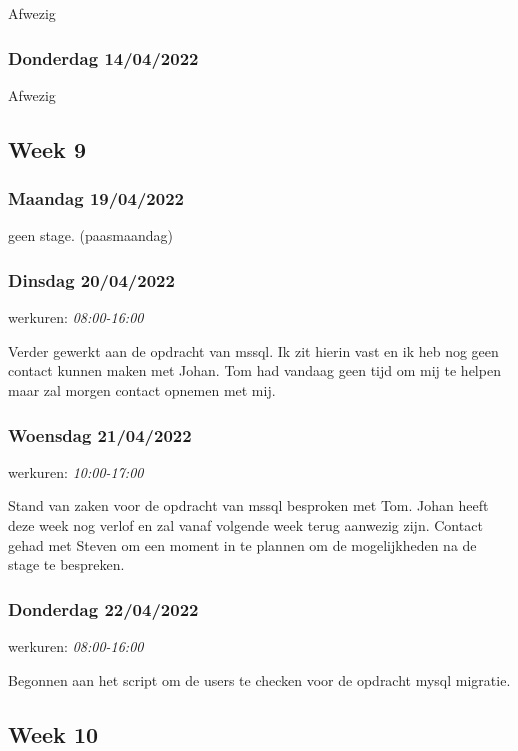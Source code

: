 Afwezig

\subsubsection{Donderdag 14/04/2022}

Afwezig

\subsection{Week 9}

\subsubsection{Maandag 19/04/2022}

geen stage. (paasmaandag)

\subsubsection{Dinsdag 20/04/2022}

werkuren: \emph{08:00-16:00}

Verder gewerkt aan de opdracht van \gls{mssql}. Ik zit hierin vast en ik heb nog geen contact kunnen maken met Johan. Tom had vandaag geen tijd om mij te helpen maar zal morgen contact opnemen met mij.

\subsubsection{Woensdag 21/04/2022}

werkuren: \emph{10:00-17:00}

Stand van zaken voor de opdracht van \gls{mssql} besproken met Tom. Johan heeft deze week nog verlof en zal vanaf volgende week terug aanwezig zijn. Contact gehad met Steven om een moment in te plannen om de mogelijkheden na de stage te bespreken.

\subsubsection{Donderdag 22/04/2022}

werkuren: \emph{08:00-16:00}

Begonnen aan het script om de users te checken voor de opdracht mysql migratie.

\subsection{Week 10}

